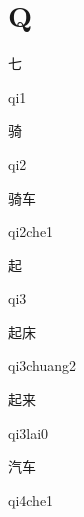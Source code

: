 ﻿%
\section*{Q}
\begin{multicols*}{2}

\begin{verbete}[qi1]{七}
\begin{pronuncia}{qi1}
\end{pronuncia}
\end{verbete}

\begin{verbete}[qi2]{骑}
\begin{pronuncia}{qi2}
\end{pronuncia}
\end{verbete}

\begin{verbete}[qi2che1]{骑车}
\begin{pronuncia}{qi2che1}
\end{pronuncia}
\end{verbete}

\begin{verbete}[qi3]{起}
\begin{pronuncia}{qi3}
\end{pronuncia}
\end{verbete}

\begin{verbete}[qi3chuang2]{起床}
\begin{pronuncia}{qi3chuang2}
\end{pronuncia}
\end{verbete}

\begin{verbete}[qi3lai0]{起来}
\begin{pronuncia}{qi3lai0}
\end{pronuncia}
\end{verbete}

\begin{verbete}[qi4che1]{汽车}
\begin{pronuncia}{qi4che1}
\end{pronuncia}
\end{verbete}


\end{multicols*}
